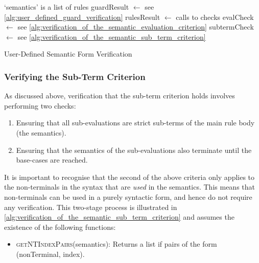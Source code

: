 \begin{algorithm}[!htb]
\begin{algorithmic}
    \Comment `semantics' is a list of rules
    \State guardResult $\gets$ 
    \Comment see \autoref{alg:user_defined_guard_verification}
    \State rulesResult $\gets$ 
    \State {}
\EndFunction
\State
{}
    \Comment calls to checks
    \State evalCheck $\gets$ 
    \Comment see \autoref{alg:verification_of_the_semantic_evaluation_criterion}
    \State subtermCheck $\gets$ 
    \Comment see \autoref{alg:verification_of_the_semantic_sub_term_criterion}
    \State {}
\EndFunction
\end{algorithmic}
\caption{User-Defined Semantic Form Verification}
\label{alg:user_defined_semantic_form_verification}
\end{algorithm}


\subsubsection{Verifying the Sub-Term Criterion} %
\label{ssub:verifying_the_sub_term_criterion}
As discussed above, verification that the sub-term criterion holds involves performing two checks:
\begin{enumerate}
    \item Ensuring that all sub-evaluations are strict sub-terms of the main rule body (the semantics).
    \item Ensuring that the semantics of the sub-evaluations also terminate until the base-cases are reached. 
\end{enumerate}

It is important to recognise that the second of the above criteria only applies to the non-terminals in the syntax that are \textit{used} in the semantics.
This means that non-terminals can be used in a purely syntactic form, and hence do not require any verification.
This two-stage process is illustrated in \autoref{alg:verification_of_the_semantic_sub_term_criterion} and assumes the existence of the following functions:
\begin{itemize}
    \item \textsc{getNTIndexPairs}(semantics): Returns a list if pairs of the form (nonTerminal, index).
\end{itemize}

